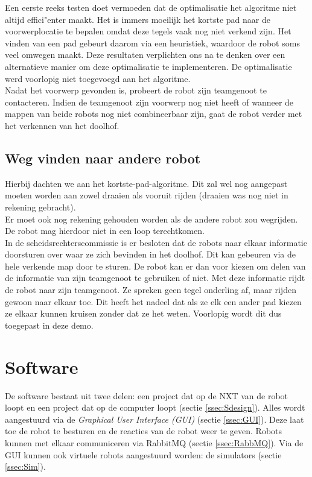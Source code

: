 \documentclass[tt2]{penoverslag}
\begin{document}

Een eerste reeks testen doet vermoeden dat de optimalisatie het algoritme niet altijd effici"enter maakt. Het is immers moeilijk het kortste pad naar de voorwerplocatie te bepalen omdat deze tegels vaak nog niet verkend zijn. Het vinden van een pad gebeurt daarom via een heuristiek, waardoor de robot soms veel omwegen maakt. %
Deze resultaten verplichten ons na te denken over een alternatieve manier om deze optimalisatie te implementeren. De optimalisatie werd voorlopig niet toegevoegd aan het algoritme. \\

Nadat het voorwerp gevonden is, probeert de robot zijn teamgenoot te contacteren. Indien de teamgenoot zijn voorwerp nog niet heeft of wanneer de mappen van beide robots nog niet combineerbaar zijn, gaat de robot verder met het verkennen van het doolhof. \\

\subsection{Weg vinden naar andere robot}
Hierbij dachten we aan het kortste-pad-algoritme. Dit zal wel nog aangepast moeten worden aan zowel draaien als vooruit rijden (draaien was nog niet in rekening gebracht).\\ Er moet ook nog rekening gehouden worden als de andere robot zou wegrijden. De robot mag hierdoor niet in een loop terechtkomen. \\

In de scheidsrechterscommissie is er besloten dat de robots naar elkaar informatie doorsturen over waar ze zich bevinden in het doolhof. Dit kan gebeuren via de hele verkende map door te sturen. De robot kan er dan voor kiezen om delen van de informatie van zijn teamgenoot te gebruiken of niet. Met deze informatie rijdt de robot naar zijn teamgenoot. Ze spreken geen tegel onderling af, maar rijden gewoon naar elkaar toe. Dit heeft het nadeel dat als ze elk een ander pad kiezen ze elkaar kunnen kruisen zonder dat ze het weten. Voorlopig wordt dit dus toegepast in deze demo.\\

\section{Software}
\label{secc:softw}
De software bestaat uit twee delen: een project dat op de NXT van de robot loopt en een project dat op de computer loopt (sectie \ref{ssec:Sdesign}). Alles wordt aangestuurd via de \textit{Graphical User Interface (GUI)} (sectie \ref{ssec:GUI}). Deze laat toe de robot te besturen en de reacties van de robot weer te geven. Robots kunnen met elkaar communiceren via RabbitMQ (sectie \ref{ssec:RabbMQ}). Via de GUI kunnen ook virtuele robots aangestuurd worden: de simulators (sectie \ref{ssec:Sim}).\\
\end{document}
